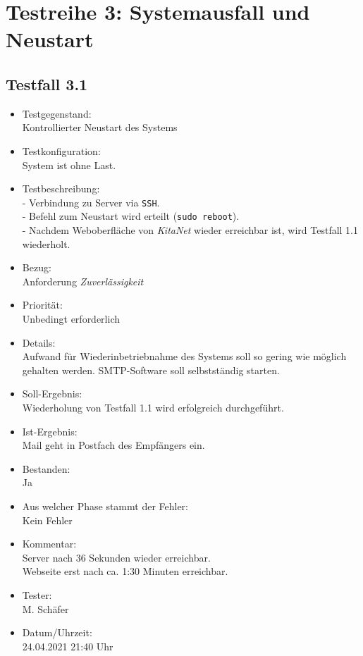 \section{Testreihe 3: Systemausfall und Neustart}
\subsection{Testfall 3.1}
\begin{itemize}
	\item Testgegenstand:\\
Kontrollierter Neustart des Systems
	\item Testkonfiguration:\\
	System ist ohne Last.
	\item Testbeschreibung:\\
	- Verbindung zu Server via \verb+SSH+. \\
	- Befehl zum Neustart wird erteilt (\verb+sudo reboot+). \\
	- Nachdem Weboberfläche von \textit{KitaNet} wieder erreichbar ist, wird Testfall 1.1 wiederholt.
	\item Bezug:\\
	Anforderung \textit{Zuverlässigkeit}
	\item Priorität:\\
	Unbedingt erforderlich
	\item Details:\\
	Aufwand für Wiederinbetriebnahme des Systems soll so gering wie möglich gehalten werden. SMTP-Software soll selbstständig starten.
	\item Soll-Ergebnis:\\
	Wiederholung von Testfall 1.1 wird erfolgreich durchgeführt.
	\item Ist-Ergebnis:\\
	Mail geht in Postfach des Empfängers ein.
	\item Bestanden:\\
	Ja
	\item Aus welcher Phase stammt der Fehler:\\
	Kein Fehler
	\item Kommentar:\\
	Server nach 36 Sekunden wieder erreichbar.\\
	Webseite erst nach ca. 1:30 Minuten erreichbar.
	\item Tester:\\
	M. Schäfer
	\item Datum/Uhrzeit:\\
	24.04.2021 21:40 Uhr
\end{itemize}

